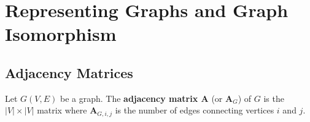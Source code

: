 \documentclass[./Discrete Math.tex]{subfiles}
\begin{document}
	\section{Representing Graphs and Graph Isomorphism}
		\setcounter{subsection}{2}
		\subsection{Adjacency Matrices}
			Let \(G(V, E)\) be a graph. The \textbf{adjacency matrix A} (or \(\textbf{A}_G\)) of \(G\) is the \(|V| \times |V|\) matrix where \(\textbf{A}_{G, i, j}\) is the number of edges connecting vertices \(i\) and \(j\).
\end{document}
